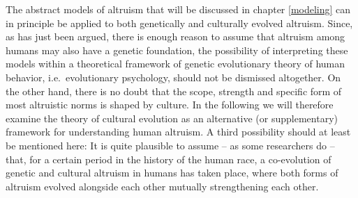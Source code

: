The abstract models of altruism that will be discussed in chapter
\ref{modeling} can in principle be applied to both genetically and
culturally evolved altruism. Since, as has just been argued, there is
enough reason to assume that altruism among humans may also have a
genetic foundation, the possibility of interpreting these models
within a theoretical framework of genetic evolutionary theory of human
behavior, i.e.\ evolutionary psychology, should not be dismissed
altogether. On the other hand, there is no doubt that the scope,
strength and specific form of most altruistic norms is shaped by
culture. In the following we will therefore examine the theory of
cultural evolution as an alternative (or supplementary) framework for
understanding human altruism. A third possibility should at least be
mentioned here: It is quite plausible to assume -- as some researchers
do \cite[p.\ 241ff.]{laland-brown:2004} -- that, for a certain period
in the history of the human race, a co-evolution of genetic and
cultural altruism in humans has taken place, where both forms of
altruism evolved alongside each other mutually strengthening each
other.

